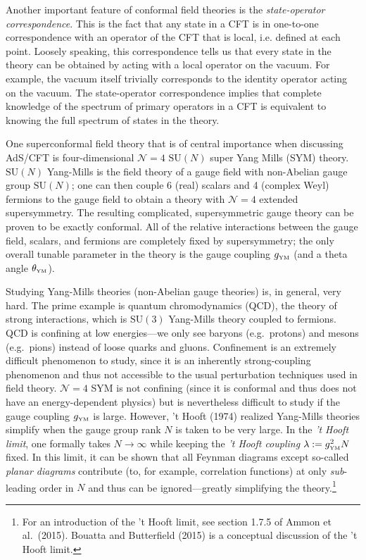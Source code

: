 \documentclass[12pt]{article}
\newcommand\bra[1]{{\langle {#1}|}}
\def\bra{\langle}
\renewcommand{\^}[1]{\hat{#1}}
\newcommand{\tn}[1]{\mbox{\tiny #1}}
\begin{document}
Another important feature of conformal field theories is the \emph{state-operator correspondence}. This is the fact that any state in a CFT is in one-to-one correspondence with an operator of the CFT that is local, i.e. defined at each point. Loosely speaking, this correspondence tells us that every state in the theory can be obtained by acting with a local operator on the vacuum. For example, the vacuum itself trivially corresponds to the identity operator acting on the vacuum. The state-operator correspondence implies that complete knowledge of the spectrum of primary operators in a CFT is equivalent to knowing the full spectrum of states in the theory.

One superconformal field theory that is of central importance when discussing AdS/CFT is four-dimensional $\mathcal{N}=4$ $\mbox{SU}(N)$ super Yang Mills (SYM) theory. $\mbox{SU}(N)$ Yang-Mills is the field theory of a gauge field with non-Abelian gauge group $\mbox{SU}(N)$; one can then couple 6 (real) scalars and 4 (complex Weyl) fermions to the gauge field to obtain a theory with $\mathcal{N}=4$ extended supersymmetry. The resulting complicated, supersymmetric gauge theory can be proven to be exactly conformal. All of the relative interactions between the gauge field, scalars, and fermions are completely fixed by supersymmetry; the only overall tunable parameter in the theory is the gauge coupling $g_{\tn{YM}}$ (and a theta angle $\theta_{\tn{YM}}$).

Studying Yang-Mills theories (non-Abelian gauge theories) is, in general, very hard. The prime example is quantum chromodynamics (QCD), the theory of strong interactions, which is $\mbox{SU}(3)$ Yang-Mills theory coupled to fermions. QCD is confining at low energies---we only see baryons (e.g.~protons) and mesons (e.g.~pions) instead of loose quarks and gluons. Confinement is an extremely difficult phenomenon to study, since it is an inherently strong-coupling phenomenon and thus not accessible to the usual perturbation techniques used in field theory. $\mathcal{N}=4$ SYM is not confining (since it is conformal and thus does not have an energy-dependent physics) but is nevertheless difficult to study if the gauge coupling $g_{\tn{YM}}$ is large. However, 't Hooft (1974) realized Yang-Mills theories simplify when the gauge group rank $N$ is taken to be very large. In the \emph{'t Hooft limit}, one formally takes $N\rightarrow \infty$ while keeping the \emph{'t Hooft coupling} $\lambda := g_{\tn{YM}}^2 N$ fixed. In this limit, it can be shown that all Feynman diagrams except so-called \emph{planar diagrams} contribute (to, for example, correlation functions) at only {\em sub}-leading order in $N$ and thus can be ignored---greatly simplifying the theory.\footnote{For an introduction of the 't Hooft limit, see section 1.7.5 of Ammon et al.~(2015). Bouatta and Butterfield (2015) is a conceptual discussion of the 't Hooft limit.}
\end{document}
